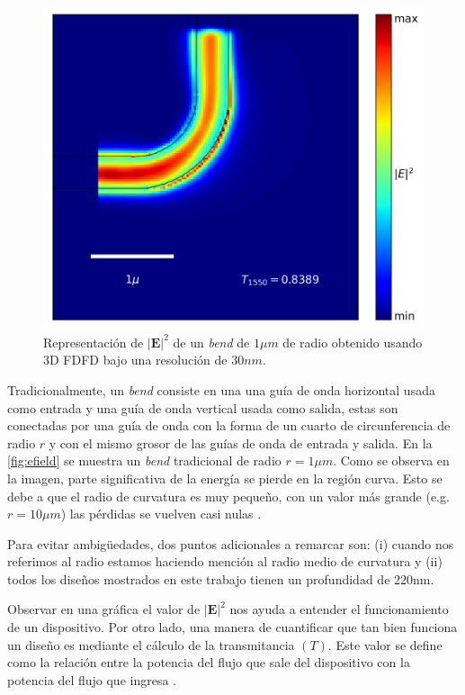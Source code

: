 \begin{figure}[ht]
  \centering
  \includegraphics[scale=0.7]{image/theory/bend_field_dx30_px16_rint1000.png}
   \caption{Representación de $|\boldsymbol{E}|^2$ de un \emph{bend} de $1 \mu m$ de radio obtenido usando 3D FDFD bajo una resolución de $30 nm$.}
  \label{fig:efield}
\end{figure}


Tradicionalmente, un \emph{bend} consiste en una una guía de onda horizontal usada como entrada y
una guía de onda vertical usada como salida, estas son conectadas por una guía de onda con la forma de un
cuarto de circunferencia de radio $r$ y con el mismo grosor de las guías de onda de entrada y salida.
En la \autoref{fig:efield} se muestra un \emph{bend} tradicional de radio $r = 1 \mu m$.
Como se observa en la imagen, parte significativa de la energía se pierde en la región curva.
Esto se debe a que el radio de curvatura es muy pequeño, con un valor más grande (e.g. $r = 10 \mu m$) 
las pérdidas se vuelven casi nulas \citep{LukasChrostowski2010}.


Para evitar ambigüedades, dos puntos adicionales a remarcar son: 
(i) cuando nos referimos al radio estamos haciendo mención al radio medio de curvatura y 
(ii) todos los diseños mostrados en este trabajo tienen un profundidad de 220nm.

Observar en una gráfica el valor de $|\boldsymbol{E}|^2$ nos ayuda a entender el funcionamiento de un dispositivo.
Por otro lado, una manera de cuantificar que tan bien funciona un diseño es mediante el cálculo de la
transmitancia $(T)$.
Este valor se define como la relación entre la potencia del flujo que sale del dispositivo con la 
potencia del flujo que ingresa \citep{Christiansen2021}.

